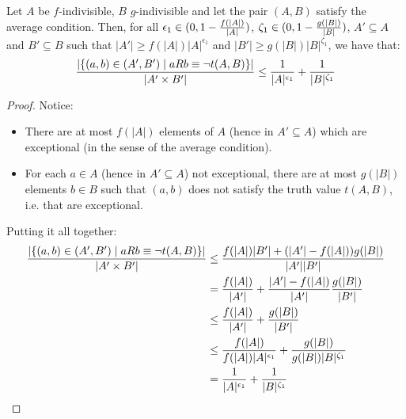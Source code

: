 
    \begin{lemma} \label{lem:exceptions_bound_of_f_indivisible_sets}
        Let $A$ be $f$-indivisible, $B$ $g$-indivisible and let the pair $(A,B)$ satisfy the average condition.
        Then, for all $\epsilon_1 \in ( 0, 1-\frac{f(|A|)}{|A|} )$, $\zeta_1 \in ( 0, 1-\frac{g(|B|)}{|B|} )$, $A' \subseteq A$
            and $B' \subseteq B$ such that $|A'| \geq f(|A|) |A|^{\epsilon_1}$ and $|B'| \geq g(|B|) |B|^{\zeta_1}$,
            we have that:
        \[
            \frac{|\{ (a,b) \in (A',B') \mid a R b \equiv \neg t(A,B) \}|}{|A' \times B'|} \leq
                \frac{1}{|A|^{\epsilon_1}} + \frac{1}{|B|^{\zeta_1}}
        \]
        \begin{proof}
            Notice:
            \begin{itemize}
                \item There are at most $f(|A|)$ elements of $A$ (hence in $A' \subseteq A$) which are exceptional
                    (in the sense of the average condition).
                \item For each $a \in A$ (hence in $A' \subseteq A$) not exceptional, there are at most $g(|B|)$ elements
                    $b \in B$ such that $(a,b)$ does not satisfy the truth value $t(A,B)$, i.e. that are exceptional.
            \end{itemize}
            Putting it all together:
            \[
                \begin{split}
                    \frac{|\{ (a,b) \in (A',B') \mid a R b \equiv \neg t(A,B) \}|}{|A' \times B'|}
                        &\leq \frac{f(|A|) |B'| + (|A'| - f(|A|)) g(|B|)}{|A'| |B'|} \\
                        &= \frac{f(|A|)}{|A'|} + \frac{|A'| - f(|A|)}{|A'|} \frac{g(|B|)}{|B'|} \\
                        &\leq \frac{f(|A|)}{|A'|} + \frac{g(|B|)}{|B'|} \\
                        &\leq \frac{f(|A|)}{f(|A|) |A|^{\epsilon_1}} + \frac{g(|B|)}{g(|B|) |B|^{\zeta_1}} \\
                        &= \frac{1}{|A|^{\epsilon_1}} + \frac{1}{|B|^{\zeta_1}}
                \end{split}
            \]
        \end{proof}
    \end{lemma}

